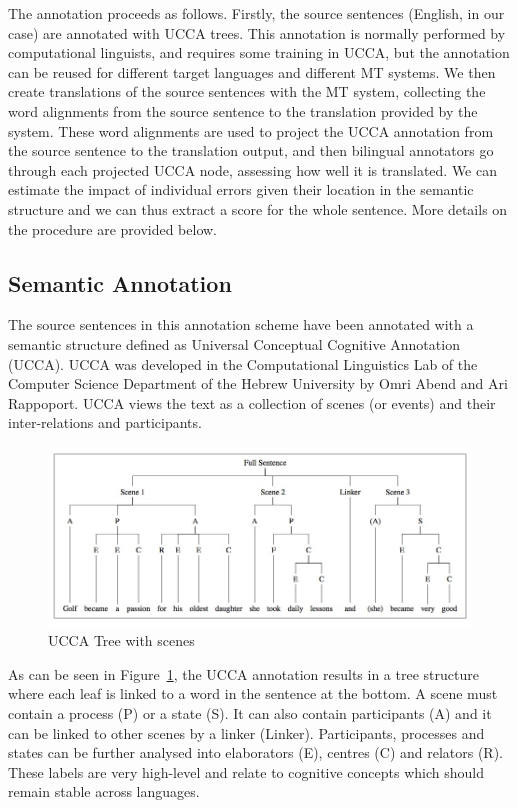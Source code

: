 \documentclass[11pt,letterpaper]{article}
\begin{document}
{The annotation proceeds as follows. Firstly, the source sentences (English, in our case) are annotated with UCCA trees. This
annotation is normally performed by computational linguists, and requires some training in UCCA, but the annotation can be 
reused for different target languages and different MT systems. 
We then create translations of the source sentences with the
MT system, collecting the word alignments from 
%
the
source sentence to 
the
translation provided by the system. These word
alignments are used to project the UCCA annotation from the source sentence to the translation output, and then bilingual
annotators go through each projected UCCA node, assessing how well it is translated.  
We can estimate the impact of individual errors given their location in the semantic structure 
and we can thus extract a score for the whole sentence. More details on the procedure are provided 
below.


\subsection{Semantic Annotation}

The source sentences in this annotation scheme have been annotated with  a semantic structure defined as
Universal Conceptual Cognitive Annotation (UCCA).  UCCA was developed in the Computational Linguistics Lab of the Computer Science Department of the Hebrew University by Omri Abend and Ari Rappoport.
UCCA views the text as a collection of scenes (or events)
and their inter-relations and participants. 

\begin{figure}[t]
    \includegraphics[width=1\textwidth]{ucca-tree.jpg}
    \caption{UCCA Tree with scenes}
    \label{ucca-tree}
\end{figure}

As can be seen
in Figure~\ref{ucca-tree}, the UCCA annotation results in a tree structure where each leaf is linked to
a word in the sentence at the bottom. A scene must contain a process (P) or a state (S). It can also contain
participants (A) and it can be linked to other scenes by a linker (Linker). Participants, processes and states can be
further analysed into elaborators (E), centres (C) and relators (R). These labels are very 
high-level 
and relate to
cognitive concepts which should remain stable across languages.  

}
\end{document}
